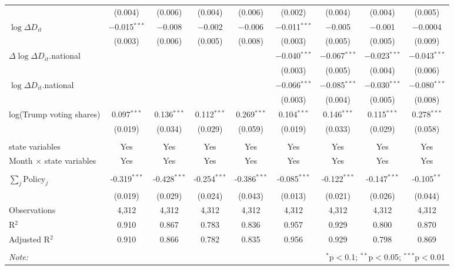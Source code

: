 \begin{tabular}{@{\extracolsep{1pt}}lcccccccc}
  & (0.004) & (0.006) & (0.004) & (0.006) & (0.002) & (0.004) & (0.004) & (0.005) \\ 
  $\log \Delta D_{it}$ & $-$0.015$^{***}$ & $-$0.008 & $-$0.002 & $-$0.006 & $-$0.011$^{***}$ & $-$0.005 & $-$0.001 & $-$0.0004 \\ 
  & (0.003) & (0.006) & (0.005) & (0.008) & (0.003) & (0.005) & (0.005) & (0.009) \\ 
  $\Delta \log \Delta D_{it}$.national &  &  &  &  & $-$0.040$^{***}$ & $-$0.067$^{***}$ & $-$0.023$^{***}$ & $-$0.043$^{***}$ \\ 
  &  &  &  &  & (0.003) & (0.005) & (0.004) & (0.006) \\ 
  $\log \Delta D_{it}$.national &  &  &  &  & $-$0.066$^{***}$ & $-$0.085$^{***}$ & $-$0.030$^{***}$ & $-$0.080$^{***}$ \\ 
  &  &  &  &  & (0.003) & (0.004) & (0.005) & (0.008) \\ 
  log(Trump voting shares) & 0.097$^{***}$ & 0.136$^{***}$ & 0.112$^{***}$ & 0.269$^{***}$ & 0.104$^{***}$ & 0.146$^{***}$ & 0.115$^{***}$ & 0.278$^{***}$ \\ 
  & (0.019) & (0.034) & (0.029) & (0.059) & (0.019) & (0.033) & (0.029) & (0.058) \\ 
 \hline \\[-1.8ex] 
state variables & Yes & Yes & Yes & Yes & Yes & Yes & Yes & Yes \\ 
Month $\times$ state variables & Yes & Yes & Yes & Yes & Yes & Yes & Yes & Yes \\ 
\hline \\[-1.8ex] 
$\sum_j \mathrm{Policy}_j$ & -0.319$^{***}$ & -0.428$^{***}$ & -0.254$^{***}$ & -0.386$^{***}$ & -0.085$^{***}$ & -0.122$^{***}$ & -0.147$^{***}$ & -0.105$^{**}$ \\ 
 & (0.019) & (0.029) & (0.024) & (0.043) & (0.013) & (0.021) & (0.026) & (0.044) \\ 
Observations & 4,312 & 4,312 & 4,312 & 4,312 & 4,312 & 4,312 & 4,312 & 4,312 \\ 
R$^{2}$ & 0.910 & 0.867 & 0.783 & 0.836 & 0.957 & 0.929 & 0.800 & 0.870 \\ 
Adjusted R$^{2}$ & 0.910 & 0.866 & 0.782 & 0.835 & 0.956 & 0.929 & 0.798 & 0.869 \\ 
\hline 
\hline \\[-1.8ex] 
\textit{Note:}  & \multicolumn{8}{r}{$^{*}$p$<$0.1; $^{**}$p$<$0.05; $^{***}$p$<$0.01} \\ 
\end{tabular} 